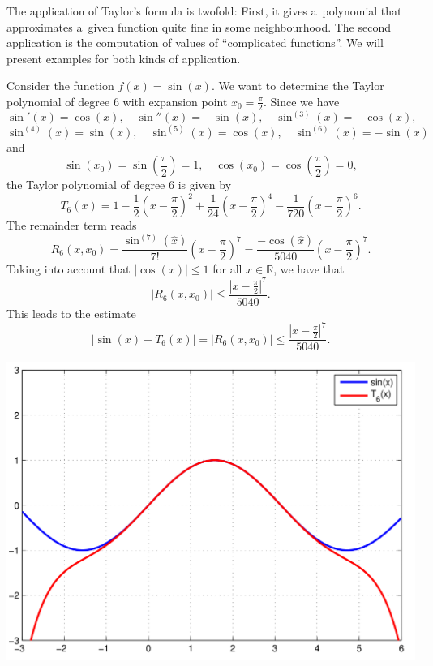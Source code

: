 

The application of Taylor's formula is twofold: First, it gives a~polynomial that approximates a~given function quite fine in some neighbourhood. 
The second application is the computation of values of ``complicated functions''. We will present examples for both kinds of application.
\begin{example}
Consider the function $f(x)=\sin(x)$. We want to determine the Taylor polynomial of degree 6 with expansion point $x_0=\frac\pi2$. Since we have
$$
\sin'(x)=\cos(x),\quad\sin''(x)=-\sin(x),\quad\sin^{(3)}(x)=-\cos(x),
$$
$$
\sin^{(4)}(x)=\sin(x),\quad\sin^{(5)}(x)=\cos(x),\quad\sin^{(6)}(x)=-\sin(x)
$$
and
\[\sin(x_0)=\sin\left(\frac\pi2\right)=1,\quad \cos(x_0)=\cos\left(\frac\pi2\right)=0,\]
the Taylor polynomial of degree 6 is given by
\[T_6(x)=1-\frac12\left(x-\frac{\pi}{2}\right)^2+\frac{1}{24}\left(x-\frac{\pi}{2}\right)^4-\frac1{720}\left(x-\frac{\pi}{2}\right)^6.\]
The remainder term reads
\[R_6(x,x_0)=\frac{\sin^{(7)}(\hat{x})}{7!}\left(x-\frac{\pi}{2}\right)^{7}
=\frac{-\cos(\hat{x})}{5040}\left(x-\frac{\pi}{2}\right)^{7}.\]
    Taking into account that $|\cos(x)|\leq1$ for all $x\in\mathbb{R}$, we have that
\[|R_6(x,x_0)|\leq\frac{\left|x-\frac{\pi}{2}\right|^{7}}{5040}.\]
This leads to the estimate
\[|\sin(x)-T_6(x)|=|R_6(x,x_0)|\leq\frac{\left|x-\frac{\pi}{2}\right|^{7}}{5040}.\]

\includegraphics{./sin.png}

\end{example}
